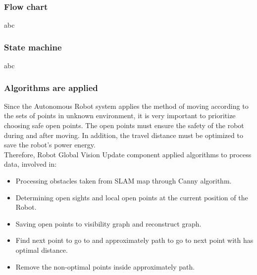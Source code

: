 \documentclass[13pt,a4paper]{article}
\begin{document}
	\subsubsection{Flow chart}
	abc
	\subsubsection{State machine}
	abc
	\subsubsection{Algorithms are applied}
	Since the Autonomous Robot system applies the method of moving according to the sets of points in unknown environment, it is very important to prioritize choosing safe open points. The open points must ensure the safety of the robot during and after moving. In addition, the travel distance must be optimized to save the robot's power energy. \\
	Therefore, Robot Global Vision Update component applied algorithms to process data, involved in:
	\begin{itemize}
		\item Processing obstacles taken from SLAM map through Canny algorithm.
		\item Determining open sights and local open points at the current position of the Robot.
		\item Saving open points to visibility graph and reconstruct graph.
		\item Find next point to go to and approximately path to go to next point with has optimal distance.
		\item Remove the non-optimal points inside approximately path.
	\end{itemize}
\end{document}
